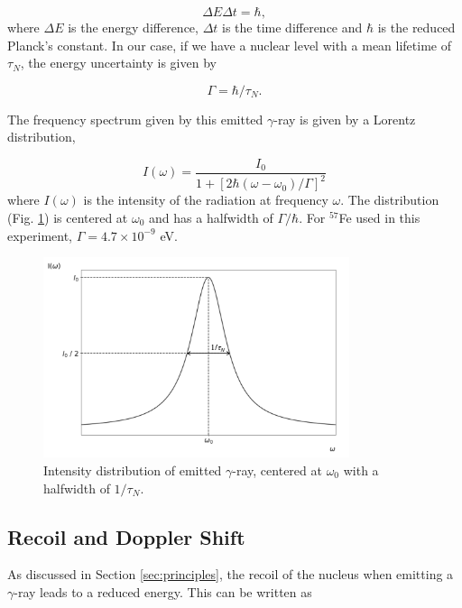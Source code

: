 \documentclass[a4paper]{report}
\numberwithin{equation}{section}
\begin{document}
\begin{equation}
		\Delta E \Delta t = \hbar,
\end{equation}
where $\Delta E $ is the energy difference, $\Delta t$ is the time difference and $\hbar $ is the reduced Planck's constant. In our case, if we have a nuclear level with a mean lifetime of $\tau _{N}$, the energy uncertainty is given by

\begin{equation} \label{eqn:uncertainty}
		\Gamma = \hbar / \tau _{N}.	
\end{equation}

The frequency spectrum given by this emitted $\gamma$-ray is given by a Lorentz distribution, 

\begin{equation}
		I (\omega) = \frac{I_{0}}{1 + [2 \hbar (\omega - \omega_{0})/\Gamma]^2}
\end{equation}
where $I(\omega)$ is the intensity of the radiation at frequency $\omega$. The distribution (Fig. \ref{fig:lorentz}) is centered at $\omega_{0}$ and has a halfwidth of $\Gamma / \hbar $. For $^{57}$Fe used in this experiment, $\Gamma = 4.7 \times 10^{-9}$ eV. 

\begin{figure}[htpb]
    \centering
    \includegraphics[width=0.8\textwidth]{lorentz}
    \caption{Intensity distribution of emitted $\gamma$-ray, centered at $\omega_{0}$ with a halfwidth of $1 / \tau _{N}$.}
    \label{fig:lorentz}
\end{figure}

\subsection{Recoil and Doppler Shift}

As discussed in Section \ref{sec:principles}, the recoil of the nucleus when emitting a $\gamma$-ray leads to a reduced energy. This can be written as
\end{document}
